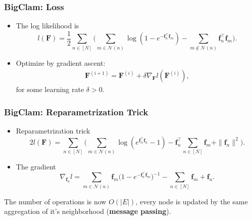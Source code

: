 \documentclass{beamer}
\newcommand{\sumgraph}{\underset{n \in [N]}{\sum}}
\def \sumneighbors {\underset {m\in{\mathcal{N}(n)}}{\sum}}
\def \sumstrangers{\underset {m\notin{\mathcal{N}(n)}}{\sum}}
\def \sumgraphu {\underset{n\in [N]}{ \sum}}
\begin{document}
\begin{frame}
\frametitle{BigClam: Loss}
\begin{itemize}[itemsep=1em, label=\textbullet]
        \item The log likelihood is 
    \[ l(\mathbf{F}) = \frac{1}{2}\sumgraph \Big(\sumneighbors{}{\log(1-e^{-\mathbf{f}_n^{\top } \mathbf{f}_m})} - 
 \sumstrangers{\mathbf{f}_n^{\top } \mathbf{f}_m}\Big).\]%
 
\item Optimize by gradient ascent:
    \begin{align}
    \label{eqn:vanilla_optimization}
    \mathbf{F}^{(i+1)} = \mathbf{F}^{(i)} + \delta\nabla_{\mathbf{F}}l({\mathbf{F}}^{(i)}),
    \end{align}%
for some learning rate $\delta>0$.    
\end{itemize}

\end{frame}



\begin{frame}
\frametitle{BigClam: Reparametrization Trick}
\begin{itemize}[itemsep=1em, label=\textbullet]
 
\item Reparametrization trick \[2l(\mathbf{F})=
   \sumgraphu \Big(\sumneighbors{\log(e^{\mathbf{f}_n^{\top } \mathbf{f}_n} - 1)}  - \mathbf{f}_n^\top {\sumgraph{\mathbf{f}_m}} + \|\mathbf{f}_n\|^2\Big).\]%
\item The gradient  
\[ \nabla_{\mathbf{f}_n}l = 
    \sumneighbors{\mathbf{f}_m \big(1-e^{-\mathbf{f}_n^\top  \mathbf{f}_m}
    \big)^{-1}} - \sumgraph{\mathbf{f}_m} + \mathbf{f}_n .\]%
    
\end{itemize}
The number of operations is now $O(|E|)$, every node is updated by the same aggregation of it's neighborhood (\textbf{message passing}).

\end{frame}
\end{document}
